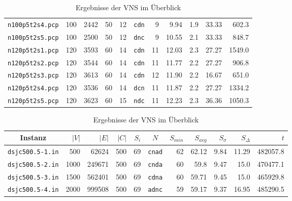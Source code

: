 \begin{table}[!htbp]
\begin{tabular}{c|rrr|r|c|rrr|r|r}
\texttt{n100p5t2s4.pcp} & 100	& 2442	& 50	& 12 & \texttt{cdn} & 9 & 9.94 & 1.9 & 33.33 & 602.3\\
\texttt{n100p5t2s5.pcp} & 100	& 2500	& 50	& 12 & \texttt{dnc} & 9 & 10.55 & 2.1 & 33.33 & 848.7\\
\texttt{n120p5t2s1.pcp} & 120	& 3593	& 60	& 14 & \texttt{cdn} & 11 & 12.03 & 2.3 & 27.27 & 1549.0\\
\texttt{n120p5t2s2.pcp} & 120	& 3544	& 60	& 14 & \texttt{cdn} & 11 & 11.77 & 2.2 & 27.27 & 906.8\\
\texttt{n120p5t2s3.pcp} & 120	& 3613	& 60	& 14 & \texttt{cdn} & 12 & 11.90 & 2.2 & 16.67 & 651.0\\
\texttt{n120p5t2s4.pcp} & 120	& 3536	& 60	& 14 & \texttt{dcn} & 11 & 11.87 & 2.2 & 27.27 & 1334.2\\
\texttt{n120p5t2s5.pcp} & 120	& 3623	& 60	& 15 & \texttt{ndc} & 11 & 12.23 & 2.3 & 36.36 & 1050.3\\
\end{tabular}
\caption{Ergebnisse der VNS im Überblick}
\label{tab:result}
\end{table}

\begin{table}[!htbp]
\centering
\begin{tabular}{c|rrr|r|c|rrr|r|r}
Instanz & $|V|$ & $|E|$ & $|C|$ & $S_i$ & $N$ & $S_{min}$ & $S_{avg}$ & $S_{\sigma}$ & $S_{\Delta}$ & $t$ \\
\hline\hline
\texttt{dsjc500.5-1.in}	& 500	& 62624	& 500	& 69	& \texttt{cnad}	& 62	& 62.12	& 9.84	& 11.29	& 482057.8\\
\texttt{dsjc500.5-2.in}	& 1000	& 249671	& 500	& 69	& \texttt{cnda}	& 60	& 59.8	& 9.47	& 15.0	& 470477.1\\
\texttt{dsjc500.5-3.in}	& 1500	& 562401	& 500	& 69	& \texttt{cdna}	& 60	& 59.71	& 9.45	& 15.0	& 465929.8\\
\texttt{dsjc500.5-4.in}	& 2000	& 999508	& 500	& 69	& \texttt{adnc}	& 59	& 59.17	& 9.37	& 16.95	& 485290.5\\
\end{tabular}
\caption{Ergebnisse der VNS im Überblick}
\label{tab:result}
\end{table}
